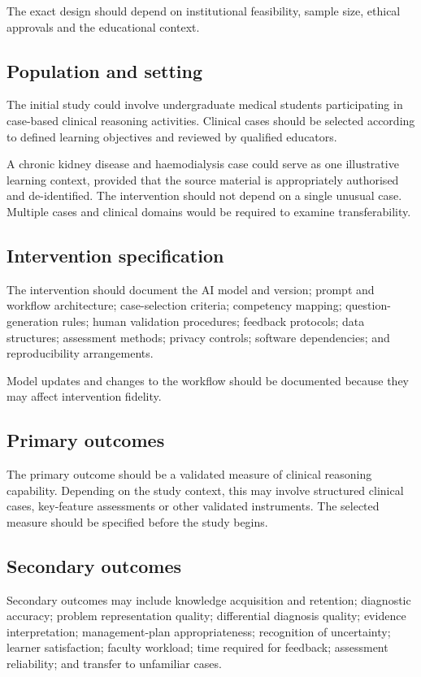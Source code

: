 \documentclass[11pt,a4paper]{article}
\begin{document}
The exact design should depend on institutional feasibility, sample size, ethical approvals and the educational context.

\subsection{Population and setting}
The initial study could involve undergraduate medical students participating in case-based clinical reasoning activities. Clinical cases should be selected according to defined learning objectives and reviewed by qualified educators.

A chronic kidney disease and haemodialysis case could serve as one illustrative learning context, provided that the source material is appropriately authorised and de-identified. The intervention should not depend on a single unusual case. Multiple cases and clinical domains would be required to examine transferability.

\subsection{Intervention specification}
The intervention should document the AI model and version; prompt and workflow architecture; case-selection criteria; competency mapping; question-generation rules; human validation procedures; feedback protocols; data structures; assessment methods; privacy controls; software dependencies; and reproducibility arrangements.

Model updates and changes to the workflow should be documented because they may affect intervention fidelity.

\subsection{Primary outcomes}
The primary outcome should be a validated measure of clinical reasoning capability. Depending on the study context, this may involve structured clinical cases, key-feature assessments or other validated instruments. The selected measure should be specified before the study begins.

\subsection{Secondary outcomes}
Secondary outcomes may include knowledge acquisition and retention; diagnostic accuracy; problem representation quality; differential diagnosis quality; evidence interpretation; management-plan appropriateness; recognition of uncertainty; learner satisfaction; faculty workload; time required for feedback; assessment reliability; and transfer to unfamiliar cases.
\end{document}
